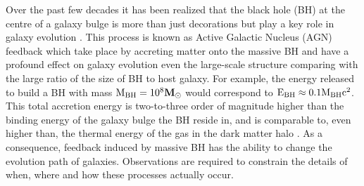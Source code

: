 \documentclass[../main.tex]{subfiles}
\begin{document}
Over the past few decades it has been realized that the black hole (BH) at the centre of a galaxy bulge is more than just decorations but play a key role in galaxy evolution \citep{fabian4114observational}. 
This process is known as Active Galactic Nucleus (AGN) feedback which take place by accreting matter onto the massive BH and have a profound effect on galaxy evolution even the large-scale structure comparing with the large ratio of the size of BH to host galaxy.
For example, the energy released to build a BH with mass $\rm M_{BH}=10^{8} \mathbf{M}_{\odot}$ would correspond to $\rm E_{BH} \approx 0.1M_{BH}c^{2}$. This total accretion energy is two-to-three order of magnitude higher than the binding energy of the galaxy bulge the BH reside in, and is comparable to, even higher than, the thermal energy of the gas in the dark matter halo \citep{harrison2016observational}. As a consequence, feedback induced by massive BH has the ability to change the evolution path of galaxies. Observations are required to constrain the details of when, where and how these processes actually occur.
\end{document}
